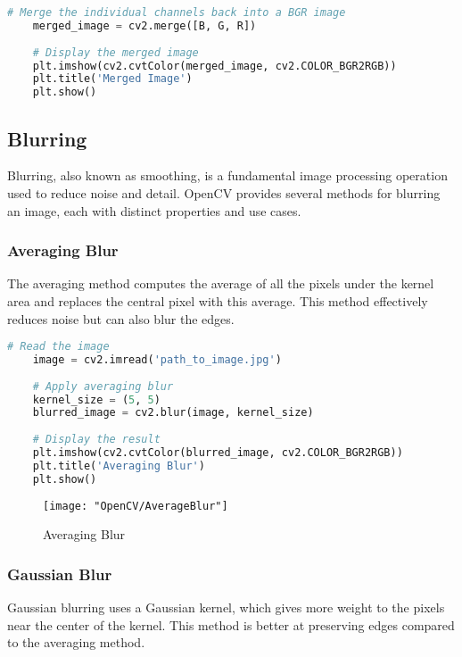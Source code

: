 \begin{lstlisting}[language=Python, caption=Merging Colour Channels]
	# Merge the individual channels back into a BGR image
	merged_image = cv2.merge([B, G, R])
	
	# Display the merged image
	plt.imshow(cv2.cvtColor(merged_image, cv2.COLOR_BGR2RGB))
	plt.title('Merged Image')
	plt.show()
\end{lstlisting}


\subsection{Blurring}

Blurring, also known as smoothing, is a fundamental image processing operation used to reduce noise and detail. OpenCV provides several methods for blurring an image, each with distinct properties and use cases.

\subsubsection{Averaging Blur}
The averaging method computes the average of all the pixels under the kernel area and replaces the central pixel with this average. This method effectively reduces noise but can also blur the edges.

\begin{lstlisting}[language=Python, caption=Averaging Blur]
	# Read the image
	image = cv2.imread('path_to_image.jpg')
	
	# Apply averaging blur
	kernel_size = (5, 5)
	blurred_image = cv2.blur(image, kernel_size)
	
	# Display the result
	plt.imshow(cv2.cvtColor(blurred_image, cv2.COLOR_BGR2RGB))
	plt.title('Averaging Blur')
	plt.show()
\end{lstlisting}

\begin{figure}[h]
	\centering
	\texttt{[image: "OpenCV/AverageBlur"]}
	\caption{Averaging Blur}\label{Averaging Blur Image}
\end{figure}

\subsubsection{Gaussian Blur}
Gaussian blurring uses a Gaussian kernel, which gives more weight to the pixels near the center of the kernel. This method is better at preserving edges compared to the averaging method.

